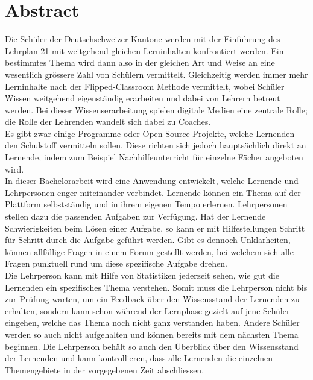 \afterpage{\blankpage}
\section*{Abstract}

Die Schüler der Deutschschweizer Kantone werden mit der Einführung des Lehrplan 21 mit weitgehend gleichen Lerninhalten konfrontiert werden. Ein bestimmtes Thema wird dann also in der gleichen Art und Weise an eine wesentlich grössere Zahl von Schülern vermittelt. Gleichzeitig werden immer mehr Lerninhalte nach der Flipped-Classroom Methode vermittelt, wobei Schüler Wissen weitgehend eigenständig erarbeiten und dabei von Lehrern betreut werden. Bei dieser Wissenserarbeitung spielen digitale Medien eine zentrale Rolle; die Rolle der Lehrenden wandelt sich dabei zu Coaches. \\

Es gibt zwar einige Programme oder Open-Source Projekte, welche Lernenden den Schulstoff vermitteln sollen. Diese richten sich jedoch hauptsächlich direkt an Lernende, indem zum Beispiel Nachhilfeunterricht für einzelne Fächer angeboten wird.\\

In dieser Bachelorarbeit wird eine Anwendung entwickelt, welche Lernende und Lehrpersonen enger miteinander verbindet. Lernende können ein Thema auf der Plattform selbstständig und in ihrem eigenen Tempo erlernen. Lehrpersonen stellen dazu die passenden Aufgaben zur Verfügung. Hat der Lernende Schwierigkeiten beim Lösen einer Aufgabe, so kann er mit Hilfestellungen Schritt für Schritt durch die Aufgabe geführt werden. Gibt es dennoch Unklarheiten, können allfällige Fragen in einem Forum gestellt werden, bei welchem sich alle Fragen punktuell rund um diese spezifische Aufgabe drehen. \\

Die Lehrperson kann mit Hilfe von Statistiken jederzeit sehen, wie gut die Lernenden ein spezifisches Thema verstehen. Somit muss die Lehrperson nicht bis zur Prüfung warten, um ein Feedback über den Wissensstand der Lernenden zu erhalten, sondern kann schon während der Lernphase gezielt auf jene Schüler eingehen, welche das Thema noch nicht ganz verstanden haben. Andere Schüler werden so auch nicht aufgehalten und können bereits mit dem nächsten Thema beginnen. Die Lehrperson behält so auch den Überblick über den Wissensstand der Lernenden und kann kontrollieren, dass alle Lernenden die einzelnen Themengebiete in der vorgegebenen Zeit abschliessen.


\newpage